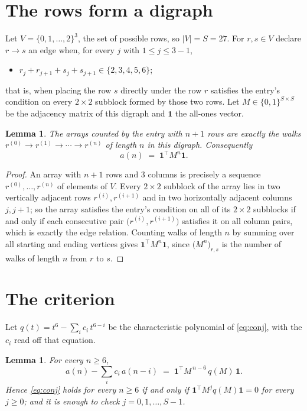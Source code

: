 \documentclass[11pt,a4paper]{article}
\theoremstyle{plain}
\newtheorem{lemma}[theorem]{Lemma}
\theoremstyle{definition}
\begin{document}
\section{The rows form a digraph}

Let $V=\{0,1,\dots,2\}^{3}$, the set of possible rows, so $|V|=S=27$. For
$r,s\in V$ declare $r\to s$ an edge when, for every $j$ with $1\le j\le 3-1$,
\begin{itemize}
\item $r_j+r_{j+1}+s_j+s_{j+1}\in\{2, 3, 4, 5, 6\}$;

\end{itemize}
that is, when placing the row $s$ directly under the row $r$ satisfies the entry's
condition on every $2\times2$ subblock formed by those two rows. Let $M\in\{0,1\}^{S\times
S}$ be the adjacency matrix of this digraph and $\mathbf{1}$ the all-ones vector.

\begin{lemma}\label{lem:walk}
The arrays counted by the entry with $n+1$ rows are exactly the walks
$r^{(0)}\to r^{(1)}\to\cdots\to r^{(n)}$ of length $n$ in this digraph. Consequently
\[
a(n)\;=\;\mathbf{1}^{\!\top}M^{n}\mathbf{1} .
\]
\end{lemma}

\begin{proof}
An array with $n+1$ rows and $3$ columns is precisely a sequence
$r^{(0)},\dots,r^{(n)}$ of elements of $V$. Every $2\times2$ subblock of the array lies
in two vertically adjacent rows $r^{(i)},r^{(i+1)}$ and in two horizontally adjacent
columns $j,j+1$; so the array satisfies the entry's condition on all of its $2\times2$
subblocks if and only if each consecutive pair $\bigl(r^{(i)},r^{(i+1)}\bigr)$ satisfies
it on all column pairs, which is exactly the edge relation. Counting walks of length $n$ by
summing over all starting and ending vertices gives
$\mathbf{1}^{\!\top}M^{n}\mathbf{1}$, since
$\bigl(M^{n}\bigr)_{r,s}$ is the number of walks of length $n$ from $r$ to $s$.
\end{proof}

\section{The criterion}

Let $q(t)=t^{6}-\sum_{i}c_i\,t^{6-i}$ be the characteristic polynomial of
\eqref{eq:conj}, with the $c_i$ read off that equation.

\begin{lemma}\label{lem:crit}
For every $n\ge6$,
\[
a(n)-\sum_i c_i\,a(n-i)\;=\;\mathbf{1}^{\!\top}M^{\,n-6}\,q(M)\,\mathbf{1} .
\]
Hence \eqref{eq:conj} holds for every $n\ge6$ if and only if
$\mathbf{1}^{\!\top}M^{j}q(M)\mathbf{1}=0$ for every $j\ge0$; and it is enough to
check $j=0,1,\dots,S-1$.
\end{lemma}
\end{document}
